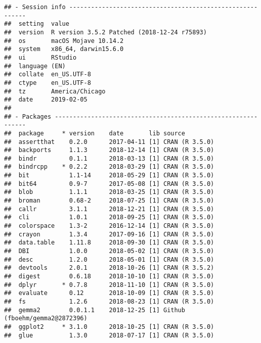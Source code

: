 \documentclass[oneside]{book}
\begin{document}
\begin{verbatim}
## - Session info ----------------------------------------------------------
##  setting  value                                      
##  version  R version 3.5.2 Patched (2018-12-24 r75893)
##  os       macOS Mojave 10.14.2                       
##  system   x86_64, darwin15.6.0                       
##  ui       RStudio                                    
##  language (EN)                                       
##  collate  en_US.UTF-8                                
##  ctype    en_US.UTF-8                                
##  tz       America/Chicago                            
##  date     2019-02-05                                 
## 
## - Packages --------------------------------------------------------------
##  package     * version    date       lib source                           
##  assertthat    0.2.0      2017-04-11 [1] CRAN (R 3.5.0)                   
##  backports     1.1.3      2018-12-14 [1] CRAN (R 3.5.0)                   
##  bindr         0.1.1      2018-03-13 [1] CRAN (R 3.5.0)                   
##  bindrcpp    * 0.2.2      2018-03-29 [1] CRAN (R 3.5.0)                   
##  bit           1.1-14     2018-05-29 [1] CRAN (R 3.5.0)                   
##  bit64         0.9-7      2017-05-08 [1] CRAN (R 3.5.0)                   
##  blob          1.1.1      2018-03-25 [1] CRAN (R 3.5.0)                   
##  broman        0.68-2     2018-07-25 [1] CRAN (R 3.5.0)                   
##  callr         3.1.1      2018-12-21 [1] CRAN (R 3.5.0)                   
##  cli           1.0.1      2018-09-25 [1] CRAN (R 3.5.0)                   
##  colorspace    1.3-2      2016-12-14 [1] CRAN (R 3.5.0)                   
##  crayon        1.3.4      2017-09-16 [1] CRAN (R 3.5.0)                   
##  data.table    1.11.8     2018-09-30 [1] CRAN (R 3.5.0)                   
##  DBI           1.0.0      2018-05-02 [1] CRAN (R 3.5.0)                   
##  desc          1.2.0      2018-05-01 [1] CRAN (R 3.5.0)                   
##  devtools      2.0.1      2018-10-26 [1] CRAN (R 3.5.2)                   
##  digest        0.6.18     2018-10-10 [1] CRAN (R 3.5.0)                   
##  dplyr       * 0.7.8      2018-11-10 [1] CRAN (R 3.5.0)                   
##  evaluate      0.12       2018-10-09 [1] CRAN (R 3.5.0)                   
##  fs            1.2.6      2018-08-23 [1] CRAN (R 3.5.0)                   
##  gemma2        0.0.1.1    2018-12-25 [1] Github (fboehm/gemma2@2872396)   
##  ggplot2     * 3.1.0      2018-10-25 [1] CRAN (R 3.5.0)                   
##  glue          1.3.0      2018-07-17 [1] CRAN (R 3.5.0)                   

\end{verbatim}
\end{document}
